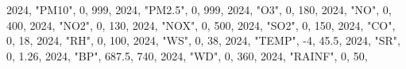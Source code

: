 \documentclass[
  letterpaper,
  DIV=11,
  numbers=noendperiod]{scrartcl}
\newenvironment{Shaded}{\begin{snugshade}}{\end{snugshade}}
\newcommand{\DecValTok}[1]{\textcolor[rgb]{0.68,0.00,0.00}{#1}}
\newcommand{\FloatTok}[1]{\textcolor[rgb]{0.68,0.00,0.00}{#1}}
\newcommand{\NormalTok}[1]{\textcolor[rgb]{0.00,0.23,0.31}{#1}}
\newcommand{\SpecialCharTok}[1]{\textcolor[rgb]{0.37,0.37,0.37}{#1}}
\newcommand{\StringTok}[1]{\textcolor[rgb]{0.13,0.47,0.30}{#1}}
\begin{document}
\begin{Shaded}
\begin{Highlighting}[]
  \DecValTok{2024}\NormalTok{, }\StringTok{"PM10"}\NormalTok{, }\DecValTok{0}\NormalTok{, }\DecValTok{999}\NormalTok{,}
  \DecValTok{2024}\NormalTok{, }\StringTok{"PM2.5"}\NormalTok{, }\DecValTok{0}\NormalTok{, }\DecValTok{999}\NormalTok{,}
  \DecValTok{2024}\NormalTok{, }\StringTok{"O3"}\NormalTok{, }\DecValTok{0}\NormalTok{, }\DecValTok{180}\NormalTok{,}
  \DecValTok{2024}\NormalTok{, }\StringTok{"NO"}\NormalTok{, }\DecValTok{0}\NormalTok{, }\DecValTok{400}\NormalTok{,}
  \DecValTok{2024}\NormalTok{, }\StringTok{"NO2"}\NormalTok{, }\DecValTok{0}\NormalTok{, }\DecValTok{130}\NormalTok{,}
  \DecValTok{2024}\NormalTok{, }\StringTok{"NOX"}\NormalTok{, }\DecValTok{0}\NormalTok{, }\DecValTok{500}\NormalTok{,}
  \DecValTok{2024}\NormalTok{, }\StringTok{"SO2"}\NormalTok{, }\DecValTok{0}\NormalTok{, }\DecValTok{150}\NormalTok{,}
  \DecValTok{2024}\NormalTok{, }\StringTok{"CO"}\NormalTok{, }\DecValTok{0}\NormalTok{, }\DecValTok{18}\NormalTok{,}
  \DecValTok{2024}\NormalTok{, }\StringTok{"RH"}\NormalTok{, }\DecValTok{0}\NormalTok{, }\DecValTok{100}\NormalTok{,}
  \DecValTok{2024}\NormalTok{, }\StringTok{"WS"}\NormalTok{, }\DecValTok{0}\NormalTok{, }\DecValTok{38}\NormalTok{,}
  \DecValTok{2024}\NormalTok{, }\StringTok{"TEMP"}\NormalTok{, }\SpecialCharTok{{-}}\DecValTok{4}\NormalTok{, }\FloatTok{45.5}\NormalTok{,}
  \DecValTok{2024}\NormalTok{, }\StringTok{"SR"}\NormalTok{, }\DecValTok{0}\NormalTok{, }\FloatTok{1.26}\NormalTok{,}
  \DecValTok{2024}\NormalTok{, }\StringTok{"BP"}\NormalTok{, }\FloatTok{687.5}\NormalTok{, }\DecValTok{740}\NormalTok{,}
  \DecValTok{2024}\NormalTok{, }\StringTok{"WD"}\NormalTok{, }\DecValTok{0}\NormalTok{, }\DecValTok{360}\NormalTok{,}
  \DecValTok{2024}\NormalTok{, }\StringTok{"RAINF"}\NormalTok{, }\DecValTok{0}\NormalTok{, }\DecValTok{50}\NormalTok{,}


\end{Highlighting}
\end{Shaded}
\end{document}
